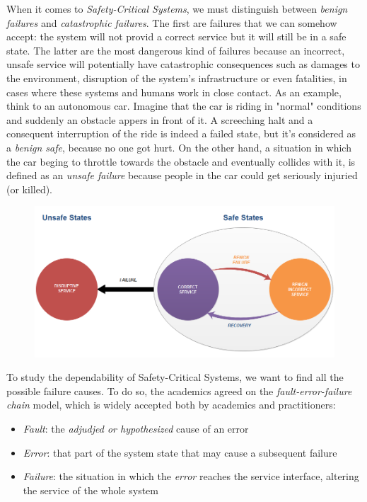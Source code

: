 When it comes to \textsl{Safety-Critical Systems}, we must distinguish between \textsl{benign failures} and \textsl{catastrophic failures}.
The first are failures that we can somehow accept: the system will not provid a correct service but it will still be in a safe state. The latter are the most dangerous kind of failures because an incorrect, unsafe service will potentially have catastrophic consequences such as damages to the environment, disruption of the system's infrastructure or even fatalities, in cases where these systems and humans work in close contact.
As an example, think to an autonomous car. Imagine that the car is riding in "normal" conditions and suddenly an obstacle appers in front of it. A screeching halt and a consequent interruption of the ride is indeed a failed state, but it's considered as a \textsl{benign safe}, because no one got hurt. On the other hand, a situation in which the car beging to throttle towards the obstacle and eventually collides with it, is defined as an \textsl{unsafe failure} because people in the car could get seriously injuried (or killed).
\newpage

\begin{figure}[h!]
	\includegraphics[width=\textwidth]{img/safe-unsafe.png}
	\caption{}
\end{figure}

To study the dependability of Safety-Critical Systems, we want to find all the possible failure causes. To do so, the academics agreed on the \textsl{fault-error-failure chain} model, which is widely accepted both by academics and practitioners:

\begin{itemize}
	\item \textsl{Fault}: the \textsl{adjudjed or hypothesized} cause of an error
	\item \textsl{Error}: that part of the system state that may cause a subsequent failure
	\item \textsl{Failure}: the situation in which the \textsl{error} reaches the service interface, altering the service of the whole system
\end{itemize}

